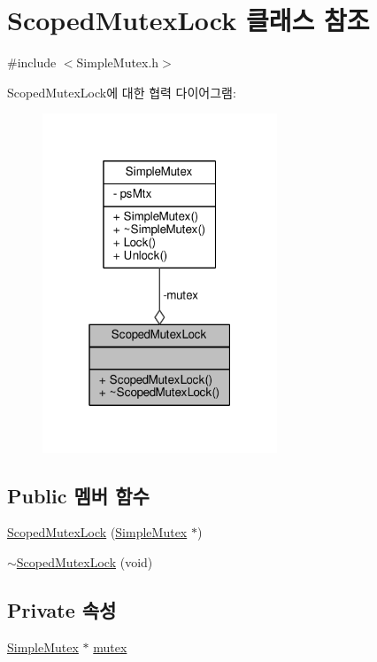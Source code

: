 \hypertarget{class_scoped_mutex_lock}{}\section{Scoped\+Mutex\+Lock 클래스 참조}
\label{class_scoped_mutex_lock}


{\ttfamily \#include $<$Simple\+Mutex.\+h$>$}



Scoped\+Mutex\+Lock에 대한 협력 다이어그램\+:
\nopagebreak
\begin{figure}[H]
\begin{center}
\leavevmode
\includegraphics[width=199pt]{class_scoped_mutex_lock__coll__graph}
\end{center}
\end{figure}
\subsection*{Public 멤버 함수}
\begin{DoxyCompactItemize}
\item 
\hyperlink{class_scoped_mutex_lock_ae933a75ca32997018c6600189c0dcb78}{Scoped\+Mutex\+Lock} (\hyperlink{class_simple_mutex}{Simple\+Mutex} $\ast$)
\item 
\hyperlink{class_scoped_mutex_lock_ae675d9045af3db5ab94a6d5b7b03a5ed}{$\sim$\+Scoped\+Mutex\+Lock} (void)
\end{DoxyCompactItemize}
\subsection*{Private 속성}
\begin{DoxyCompactItemize}
\item 
\hyperlink{class_simple_mutex}{Simple\+Mutex} $\ast$ \hyperlink{class_scoped_mutex_lock_a59e7ac696c2812cc5347f77b2ffb1daf}{mutex}
\end{DoxyCompactItemize}


